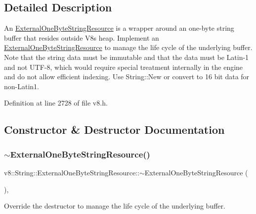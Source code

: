 \subsection{Detailed Description}
An \mbox{\hyperlink{classv8_1_1String_1_1ExternalOneByteStringResource}{External\+One\+Byte\+String\+Resource}} is a wrapper around an one-\/byte string buffer that resides outside V8\textquotesingle{}s heap. Implement an \mbox{\hyperlink{classv8_1_1String_1_1ExternalOneByteStringResource}{External\+One\+Byte\+String\+Resource}} to manage the life cycle of the underlying buffer. Note that the string data must be immutable and that the data must be Latin-\/1 and not U\+T\+F-\/8, which would require special treatment internally in the engine and do not allow efficient indexing. Use String\+::\+New or convert to 16 bit data for non-\/\+Latin1. 

Definition at line 2728 of file v8.\+h.



\subsection{Constructor \& Destructor Documentation}
\mbox{\label{classv8_1_1String_1_1ExternalOneByteStringResource_ac75c47722e5602b863cbc880dc4f5b7c}} 
\subsubsection{\texorpdfstring{$\sim$\+External\+One\+Byte\+String\+Resource()}{~ExternalOneByteStringResource()}}
{\footnotesize\ttfamily v8\+::\+String\+::\+External\+One\+Byte\+String\+Resource\+::$\sim$\+External\+One\+Byte\+String\+Resource (\begin{DoxyParamCaption}{ }\end{DoxyParamCaption})\hspace{0.3cm}{\ttfamily [override]}, {\ttfamily [default]}}

Override the destructor to manage the life cycle of the underlying buffer. 


